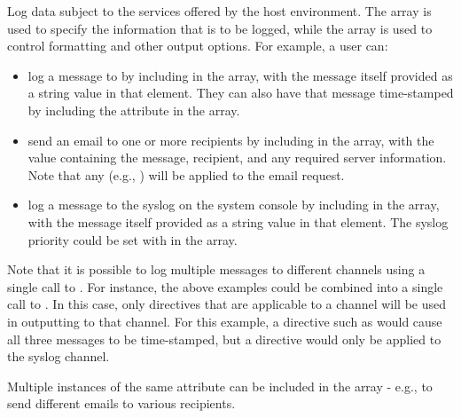 

\optattrend

\descr

Log data subject to the services offered by the host environment. The  array is used to specify the information that is to be logged, while the  array is used to control formatting and other output options. For example, a user can:

\begin{itemize}
\item log a message to  by including  in the  array, with the message itself provided as a string value in that  element. They can also have that message time-stamped by including the  attribute in the  array.
\item send an email to one or more recipients by including  in the  array, with the  value containing the message, recipient, and any required server information. Note that any  (e.g., ) will be applied to the email request.
\item log a message to the syslog on the system console by including  in the  array, with the message itself provided as a string value in that  element. The syslog priority could be set with  in the  array.
\end{itemize}

Note that it is possible to log multiple messages to different channels using a single call to . For instance, the above examples could be combined into a single call to . In this case, only directives that are applicable to a channel will be used in outputting to that channel. For this example, a directive such as  would cause all three messages to be time-stamped, but a  directive would only be applied to the syslog channel.

Multiple instances of the same attribute can be included in the  array - e.g., to send different emails to various recipients.

